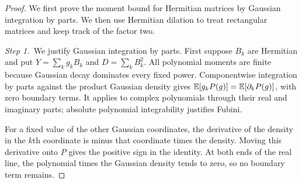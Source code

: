 \begin{proof}
  We first prove the moment bound for Hermitian matrices by Gaussian
  integration by parts. We then use Hermitian dilation to treat rectangular
  matrices and keep track of the factor two.

  \medskip
  \noindent\textit{Step 1.~}We justify Gaussian integration by parts.
  First suppose $B_k$ are Hermitian and put $Y = \sum_k g_kB_k$ and $D = \sum_k
  B_k^2$. All polynomial moments are finite because Gaussian decay dominates
  every fixed power. Componentwise integration by parts against the product
  Gaussian density gives $\mathbb{E}[g_kP(g)] = \mathbb{E}[\partial_kP(g)]$, with zero boundary
  terms. It applies to complex polynomials through their real and imaginary
  parts; absolute polynomial integrability justifies Fubini.

  For a fixed value of the other Gaussian coordinates, the derivative of the
  density in the $k$th coordinate is minus that coordinate times the density.
  Moving this derivative onto $P$ gives the positive sign in the identity. At
  both ends of the real line, the polynomial times the Gaussian density tends
  to zero, so no boundary term remains.


\end{proof}
